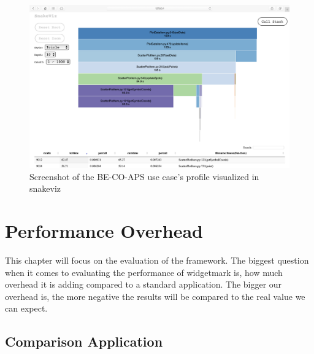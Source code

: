 \begin{figure}[h]
    \centering
    \includegraphics[width=15cm]{resources/img/profiles/ApsProfile}
    \caption{
        Screenshot of the BE-CO-APS use case's profile visualized in snakeviz
    }
    \label{fig:application:aps:usecase:profile:ht}
\end{figure}

\clearpage




\section{Performance Overhead}

This chapter will focus on the evaluation of the framework. The biggest question
when it comes to evaluating the performance of widgetmark is, how much overhead it
is adding compared to a standard application. The bigger our overhead is, the
more negative the results will be compared to the real value we can expect.

\subsection{Comparison Application}

